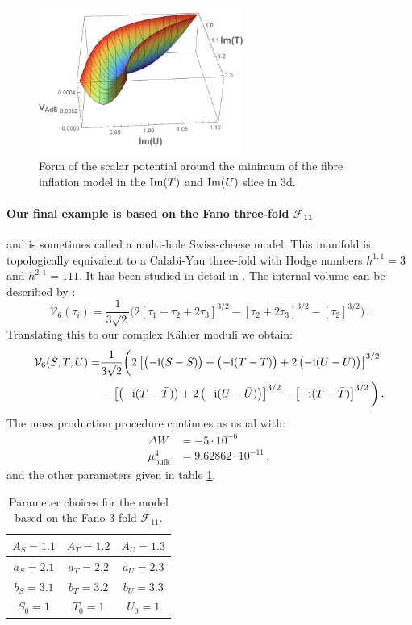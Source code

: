 \documentclass[a4paper,12pt,twoside,openright]{report}
\newcommand{\be}{\begin{equation}}
\newcommand{\ee}{\end{equation}}
\newcommand{\bea}{\begin{equation}\begin{aligned}}
\newcommand{\eea}{\end{aligned}\end{equation}}
\def\rmi{{\rm i}}
\def\rmim{{\rm Im}}
\begin{document}
\begin{figure}[H]
     \centering
     \includegraphics[width=0.6\textwidth]{fibre3DLarge.pdf}
     \caption{Form of the scalar potential around the minimum of the fibre inflation model in the $\rmim(T)$ and $\rmim(U)$ slice in 3d.}
     \label{fig:fibre3d}
\end{figure}

\paragraph{Our final example is based on the Fano three-fold $\bm{\mathcal{F}_{11}}$} and is sometimes called a multi-hole Swiss-cheese model. This manifold is topologically equivalent to a Calabi-Yau three-fold with Hodge numbers $h^{1,1} = 3$ and $h^{2,1} =111$. It has been studied in detail in \cite{Denef:2004dm}. The internal volume can be described by \cite{Cicoli:2008gp}:
\be 
\mathcal{V}_6 (\tau_i) = \frac{1}{3 \sqrt{2}} \bigg(2[\tau_1  + \tau_2 + 2 \tau_3]^{3/2} - [\tau_2 + 2 \tau_3]^{3/2} - [\tau_2]^{3/2}\bigg)\,.
\ee
Translating this to our complex Kähler moduli we obtain:
\bea
\mathcal{V}_6(S,T,U) = &\frac{1}{3 \sqrt{2}} \bigg( 2 \left[ \left(-\rmi (S-\bar{S})\right) +\left(-\rmi (T-\bar{T})\right) +2 \left(-\rmi (U-\bar{U})\right)\right]^{3/2}\\
&- \left[\left(-\rmi (T-\bar{T})\right) + 2\left(-\rmi (U-\bar{U})\right) \right]^{3/2} - \left[-\rmi (T-\bar{T})\right]^{3/2}\bigg)\,.
\eea
The mass production procedure continues as usual with:
\bea
\Delta W &= - 5 \cdot 10^{-6}\\
\mu^4_{\text{bulk}} &= 9.62862 \cdot 10^{-11}\,,
\eea
and the other parameters given in table \ref{tab:swisspara}.

\begin{table}[htb]
\centering
\begin{tabular}{|c|c|c|}\hline
$A_S = 1.1$ & $A_T = 1.2$ & $A_U =1.3$\\\hline
$a_S = 2.1$ & $a_T = 2.2$ & $a_U = 2.3$\\\hline
$b_S = 3.1$ & $b_T = 3.2$ & $b_U = 3.3$\\\hline
$S_0 = 1$ & $T_0 = 1$ & $U_0 = 1$\\\hline
\end{tabular}
\caption{ Parameter choices for the model based on the Fano 3-fold $\mathcal{F}_{11}$.}
\label{tab:swisspara}
\end{table}
\end{document}
